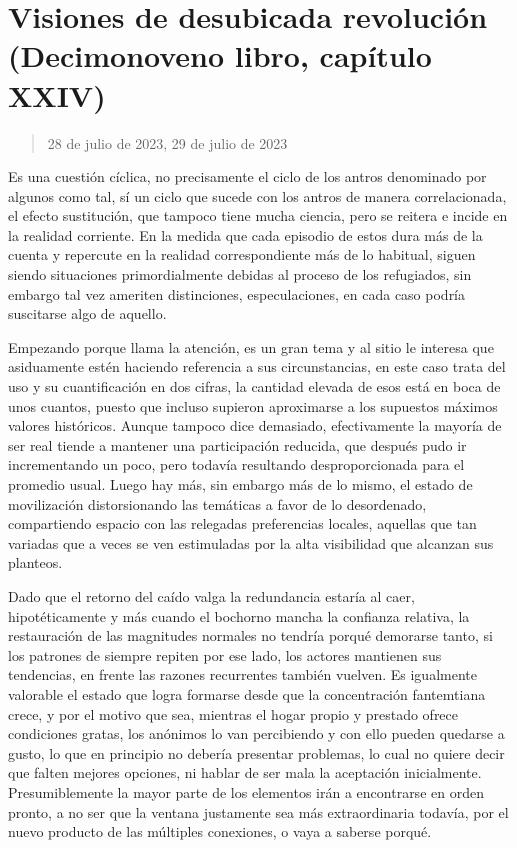\documentclass[
]{book}
\begin{document}
\hypertarget{visiones-de-desubicada-revoluciuxf3n-decimonoveno-libro-capuxedtulo-xxiv}{%
\section{Visiones de desubicada revolución (Decimonoveno libro, capítulo XXIV)}\label{visiones-de-desubicada-revoluciuxf3n-decimonoveno-libro-capuxedtulo-xxiv}}

\begin{quote}
28 de julio de 2023, 29 de julio de 2023
\end{quote}

Es una cuestión cíclica, no precisamente el ciclo de los antros denominado por algunos como tal, sí un ciclo que sucede con los antros de manera correlacionada, el efecto sustitución, que tampoco tiene mucha ciencia, pero se reitera e incide en la realidad corriente. En la medida que cada episodio de estos dura más de la cuenta y repercute en la realidad correspondiente más de lo habitual, siguen siendo situaciones primordialmente debidas al proceso de los refugiados, sin embargo tal vez ameriten distinciones, especulaciones, en cada caso podría suscitarse algo de aquello.

Empezando porque llama la atención, es un gran tema y al sitio le interesa que asiduamente estén haciendo referencia a sus circunstancias, en este caso trata del uso y su cuantificación en dos cifras, la cantidad elevada de esos está en boca de unos cuantos, puesto que incluso supieron aproximarse a los supuestos máximos valores históricos. Aunque tampoco dice demasiado, efectivamente la mayoría de ser real tiende a mantener una participación reducida, que después pudo ir incrementando un poco, pero todavía resultando desproporcionada para el promedio usual. Luego hay más, sin embargo más de lo mismo, el estado de movilización distorsionando las temáticas a favor de lo desordenado, compartiendo espacio con las relegadas preferencias locales, aquellas que tan variadas que a veces se ven estimuladas por la alta visibilidad que alcanzan sus planteos.

Dado que el retorno del caído valga la redundancia estaría al caer, hipotéticamente y más cuando el bochorno mancha la confianza relativa, la restauración de las magnitudes normales no tendría porqué demorarse tanto, si los patrones de siempre repiten por ese lado, los actores mantienen sus tendencias, en frente las razones recurrentes también vuelven. Es igualmente valorable el estado que logra formarse desde que la concentración fantemtiana crece, y por el motivo que sea, mientras el hogar propio y prestado ofrece condiciones gratas, los anónimos lo van percibiendo y con ello pueden quedarse a gusto, lo que en principio no debería presentar problemas, lo cual no quiere decir que falten mejores opciones, ni hablar de ser mala la aceptación inicialmente. Presumiblemente la mayor parte de los elementos irán a encontrarse en orden pronto, a no ser que la ventana justamente sea más extraordinaria todavía, por el nuevo producto de las múltiples conexiones, o vaya a saberse porqué.
\end{document}
